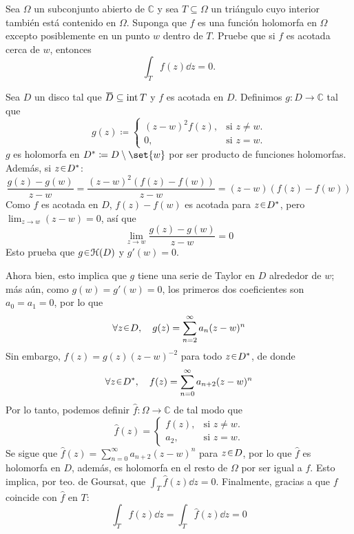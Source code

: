 \setcounter{eje}{5}
\begin{ejer}
Sea $\Omega$ un subconjunto abierto de $\mathbb{C}$ y sea $T \subseteq \Omega$ un triángulo cuyo interior también está contenido en $\Omega$. Suponga que $f$ es una función holomorfa en $\Omega$ excepto posiblemente en un punto $w$ dentro de $T$. Pruebe que si $f$ es acotada cerca de $w$, entonces
\[ \int_T f(z) \dd{z} = 0. \]
\end{ejer}
\begin{sol}
Sea $D$ un disco tal que $\ubar{D} \subseteq \inter T$ y $f$ es acotada en $D$. Definimos $g \colon D \to \mathbb{C}$ tal que 
\[
g(z) \coloneq%
\begin{cases}
    (z-w)^2f(z), &\text{si } z \neq w.\\
    0,           &\text{si } z = w.
\end{cases}
\]
$g$ es holomorfa en $D^* \coloneq D \setminus\set{w}$ por ser producto de funciones holomorfas. Además, si $z\en D^*$:
\[
\frac{g(z)- g(w)}{z-w}
= \frac{(z-w)^2(f(z) - f(w))}{z-w}
=(z-w)(f(z)-f(w))
\]
Como $f$ es acotada en $D$, $f(z)-f(w)$ es acotada para $z\en D^*$, pero $\lim_{z\to w}(z-w) = 0$, así que
\[
\lim_{z\to w}\frac{g(z)- g(w)}{z-w} = 0
\]
Esto prueba que $g\en\mathcal{H}(D)$ y $g'(w) = 0$.\par
Ahora bien, esto implica que $g$ tiene una serie de Taylor en $D$ alrededor de $w$; más aún, como $g(w) = g'(w) = 0$, los primeros dos coeficientes son $a_0 = a_1 = 0$, por lo que
\[
\forall z \en D,\quad
g(z) = \sum^\infty_{n=2} a_n(z-w)^n
\]
Sin embargo, $f(z) = g(z)(z-w)^{-2}$ para todo $z\en D^*$, de donde
\[
\forall z\en D^*,\quad
f(z) = \sum^\infty_{n=0} a_{n+2}(z-w)^n
\]
Por lo tanto, podemos definir $\hat{f} \colon \Omega \to \mathbb{C}$ de tal modo que
\[
\hat{f}(z) =%
\begin{cases}
    f(z), &\text{si } z \neq w.\\
    a_2,  &\text{si } z=w.
\end{cases}
\]
Se sigue que $\hat{f}(z) = \sum^\infty_{n=0} a_{n+2}(z-w)^n$ para $z\en D$, por lo que $\hat{f}$ es holomorfa en $D$, además, es holomorfa en el resto de $\Omega$ por ser igual a $f$. Esto implica, por teo. de Goursat, que $\int_T \hat{f}(z) \dd{z} = 0$. Finalmente, gracias a que $f$ coincide con $\hat{f}$ en $T$:
\[
\int_T f(z) \dd{z} = \int_T \hat{f}(z) \dd{z} = 0
\]
\end{sol}